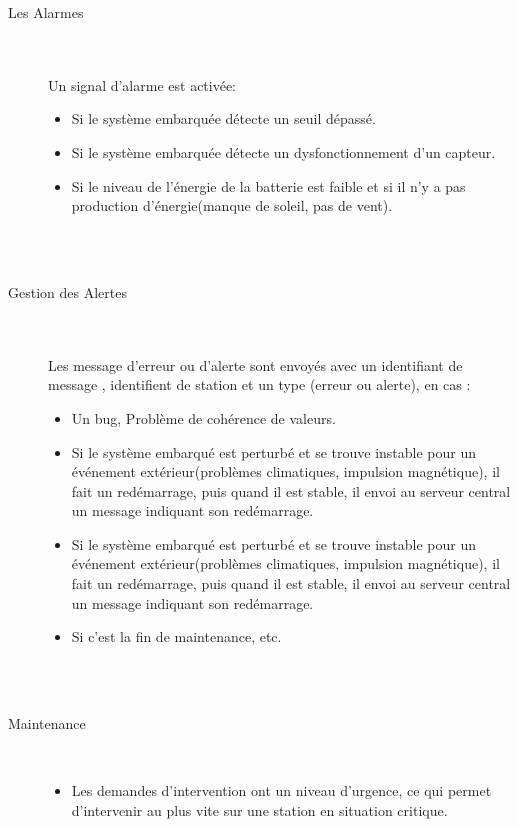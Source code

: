 \documentclass [a4paper] {report}
\begin{document}
\begin{description}
\item [Les Alarmes]\hfill\\
	\\ Un signal d'alarme est activée:\\
	\begin{itemize}
		\item Si le système embarquée détecte un seuil dépassé.\\
		\item Si le système embarquée détecte un dysfonctionnement d'un capteur.\\
		\item Si le niveau de l'énergie de la batterie est faible et si il n'y a pas production d'énergie(manque de soleil, pas de vent).\\
	\end{itemize}\\
\hfill\\
\item [Gestion des Alertes]\hfill\\
	\\ Les message d'erreur ou d'alerte sont envoyés avec un identifiant de message , identifient de station et un type (erreur ou alerte), en cas  :
		\begin{itemize}
		\item Un bug, Problème de cohérence de valeurs.\\

		\item Si le système embarqué est perturbé et se trouve instable pour un événement extérieur(problèmes climatiques, 
		impulsion magnétique), il fait un redémarrage, puis quand il est stable, il envoi au serveur central un message indiquant son redémarrage.  \\

		\item Si le système embarqué est perturbé et se trouve instable pour un événement extérieur(problèmes climatiques, impulsion magnétique), il fait un redémarrage, puis quand il est stable, il envoi au serveur central un message indiquant son redémarrage.  \\

		\item Si c'est la fin de maintenance, etc.\\\\
	\end{itemize}	\\

\item [Maintenance]\hfill\\
	\begin{itemize}
	\item Les demandes d'intervention ont un niveau d'urgence, ce qui permet d'intervenir au plus vite sur une 
station en situation critique.\\


\end{itemize}
\end{description}
\end{document}
